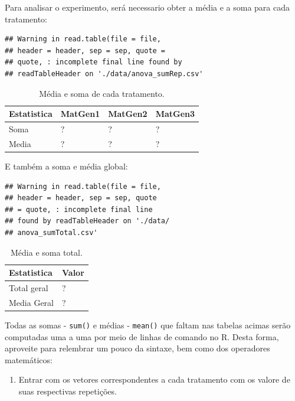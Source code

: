 \documentclass[
]{article}
\providecommand{\tightlist}{%
  \setlength{\itemsep}{0pt}\setlength{\parskip}{0pt}}
\begin{document}
Para analisar o experimento, será necessario obter a média e a soma para cada tratamento:

\begin{verbatim}
## Warning in read.table(file = file,
## header = header, sep = sep, quote =
## quote, : incomplete final line found by
## readTableHeader on './data/anova_sumRep.csv'
\end{verbatim}

\begin{table}

\caption{\label{tab:unnamed-chunk-2}Média e soma de cada tratamento.}
\centering
\begin{tabular}[t]{l|l|l|l}
\hline
Estatistica & MatGen1 & MatGen2 & MatGen3\\
\hline
Soma & ? & ? & ?\\
\hline
Media & ? & ? & ?\\
\hline
\end{tabular}
\end{table}

E também a soma e média global:

\begin{verbatim}
## Warning in read.table(file = file,
## header = header, sep = sep, quote
## = quote, : incomplete final line
## found by readTableHeader on './data/
## anova_sumTotal.csv'
\end{verbatim}

\begin{table}

\caption{\label{tab:unnamed-chunk-3}Média e soma total.}
\centering
\begin{tabular}[t]{l|l}
\hline
Estatistica & Valor\\
\hline
Total geral & ?\\
\hline
Media Geral & ?\\
\hline
\end{tabular}
\end{table}

Todas as somas - \texttt{sum()} e médias - \texttt{mean()} que faltam nas tabelas acimas serão computadas uma a uma por meio de linhas de comando no R. Desta forma, aproveite para relembrar um pouco da sintaxe, bem como dos operadores matemáticos:

\begin{enumerate}
\def\labelenumi{\arabic{enumi}.}
\tightlist
\item
  Entrar com os vetores correspondentes a cada tratamento com os valore de suas respectivas repetições.
\end{enumerate}
\end{document}
